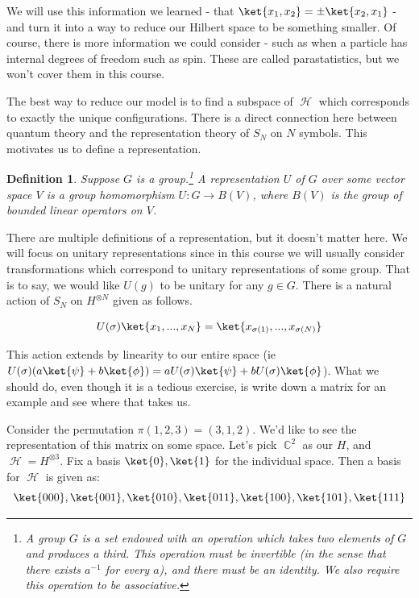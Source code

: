 \documentclass{article}
\DeclareMathOperator{\Hh}{{\mathcal{H}}}
\DeclareMathOperator{\CC}{\mathbb{C}}
\newtheorem{defn}{Definition}
\begin{document}
We will use this information we learned - that $\ket{x_1,x_2} = \pm \ket{x_2, x_1}$ - and turn it into a way to reduce our Hilbert space to be something smaller. Of course, there is more information we could consider - such as when a particle has internal degrees of freedom such as spin. These are called parastatistics, but we won't cover them in this course.

The best way to reduce our model is to find a subspace of $\Hh$ which corresponds to exactly the unique configurations. There is a direct connection here between quantum theory and the representation theory of $S_N$ on $N$ symbols. This motivates us to define a representation.

\begin{defn}
Suppose $G$ is a group.\footnote{A group $G$ is a set endowed with an operation which takes two elements of $G$ and produces a third. This operation must be invertible (in the sense that there exists $a^{-1}$ for every $a$), and there must be an identity. We also require this operation to be associative.} A representation $U$ of $G$ over some vector space $V$ is a group homomorphism $U:G \to B(V)$, where $B(V)$ is the group of bounded linear operators on $V$.
\end{defn}

There are multiple definitions of a representation, but it doesn't matter here. We will focus on unitary representations since in this course we will usually consider transformations which correspond to unitary representations of some group. That is to say, we would like $U(g)$ to be unitary for any $g \in G$. There is a natural action of $S_N$ on $H^{\otimes N}$ given as follows.

\begin{equation}
U(\sigma)\ket{x_1,...,x_N} = \ket{x_{\sigma(1)},...,x_{\sigma(N)}}
\end{equation}

This action extends by linearity to our entire space (ie $U(\sigma)(a\ket{\psi}+b\ket{\phi}) = aU(\sigma)\ket{\psi}+bU(\sigma)\ket{\phi}$). What we should do, even though it is a tedious exercise, is write down a matrix for an example and see where that takes us.

Consider the permutation $\pi(1,2,3)=(3,1,2)$. We'd like to see the representation of this matrix on some space. Let's pick $\CC^2$ as our $H$, and $\Hh=H^{\otimes 3}$. Fix a basis $\ket{0},\ket{1}$ for the individual space. Then a basis for $\Hh$ is given as:
\[\ket{000},\ket{001},\ket{010},\ket{011},\ket{100},\ket{101},\ket{111}\]
\end{document}
